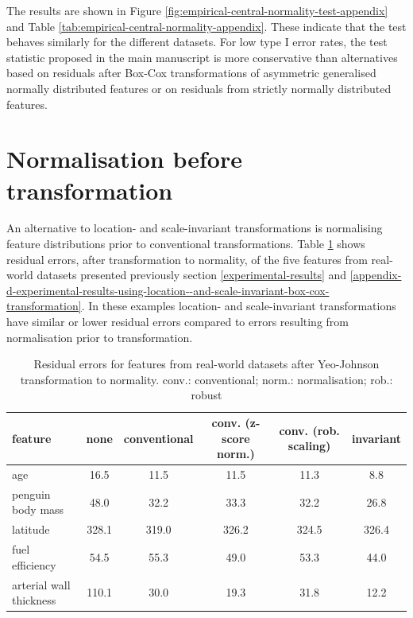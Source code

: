 \documentclass[preprint,12pt,authoryear]{elsarticle}
\begin{document}
The results are shown in Figure
\ref{fig:empirical-central-normality-test-appendix} and Table
\ref {tab:empirical-central-normality-appendix}. These indicate that the
test behaves similarly for the different datasets. For low type I error
rates, the test statistic proposed in the main manuscript is more
conservative than alternatives based on residuals after Box-Cox
transformations of asymmetric generalised normally distributed features
or on residuals from strictly normally distributed features.

\section{Normalisation before transformation}\label{appendix-f-normalisation-before-transformation}

An alternative to location- and scale-invariant transformations is
normalising feature distributions prior to conventional transformations.
Table \ref{tab:normalisation-before-transformation-appendix} shows
residual errors, after transformation to normality, of the five features
from real-world datasets presented previously section \ref{experimental-results}
and \ref{appendix-d-experimental-results-using-location--and-scale-invariant-box-cox-transformation}.
In these examples location- and scale-invariant
transformations have similar or lower residual errors compared to errors
resulting from normalisation prior to transformation.

\begin{table}
\begin{center}
\caption{Residual errors for features from real-world datasets after Yeo-Johnson transformation to normality. conv.: conventional; norm.: normalisation; rob.: robust}
\label{tab:normalisation-before-transformation-appendix}
\begin{tabular}{l | c c c c c}

\toprule
feature & none & conventional & conv. (z-score norm.) & conv. (rob. scaling) & invariant \\

\midrule
age                     &  16.5 &  11.5 &  11.5 &  11.3 &   8.8 \\
penguin body mass       &  48.0 &  32.2 &  33.3 &  32.2 &  26.8 \\
latitude                & 328.1 & 319.0 & 326.2 & 324.5 & 326.4 \\
fuel efficiency         &  54.5 &  55.3 &  49.0 &  53.3 &  44.0 \\
arterial wall thickness & 110.1 &  30.0 &  19.3 &  31.8 &  12.2 \\
\bottomrule
\end{tabular}
\end{center}
\end{table}
\end{document}

